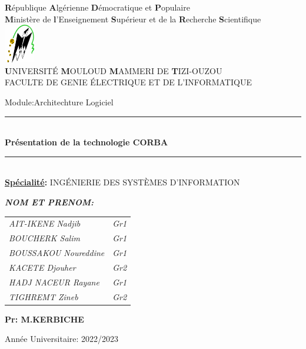 \thispagestyle{empty}

\begin{center} 

\large \textbf{R}épublique \textbf{A}lgérienne \textbf{D}émocratique et \textbf{P}opulaire\\
\textbf{M}inistère de\textbf{ l}’Enseignement \textbf{S}upérieur et de la\textbf{ R}echerche \textbf{S}cientifique\\
\includegraphics[width=0.1\textwidth]{pdg/ummto.png}\\
\textbf{U}NIVERSITÉ \textbf{M}OULOUD \textbf{M}AMMERI DE \textbf{T}IZI-OUZOU\\ \vspace*{0.3cm}
FACULTE DE GENIE ÉLECTRIQUE ET DE L’INFORMATIQUE\\\vfill


\end{center}


\begin{center}
    \huge Module:Architechture Logiciel\normalsize\\
 
    \rule{0.90\textwidth}{2pt}\\
    \LARGE \textbf
    {Présentation de la technologie \textbf{CORBA}}\\
    \normalsize
    \rule{0.90\textwidth}{2pt}\\
    \textbf{\underline{Spécialité}:} \large INGÉNIERIE DES SYSTÈMES D'INFORMATION \\
  \end{center}
    \vfill
    
    
    \begin{flushleft}   
      \large\emph{\textbf{NOM ET PRENOM:}}\\ \vspace*{0.2cm}
      \begin{tabular}{ll}
        \hline \hline
        \emph{AIT-IKENE Nadjib}    & \small\textit{Gr1} \\ 
        \emph{BOUCHERK Salim}   &  \small\textit{Gr1}\\
        \emph{BOUSSAKOU Noureddine} &\small\textit{Gr1}\\
        \emph{KACETE Djouher} &\small\textit{Gr2} \\
        \emph{HADJ NACEUR Rayane} &  \small\textit{Gr1}\\
        \emph{TIGHREMT Zineb} & \small\textit{Gr2}\\
        \hline \hline
      \end{tabular}
    \end{flushleft}
    \vfill 
    \begin{flushright}
     \large \textbf {Pr: M.KERBICHE} \\
    \end{flushright}
  \vfill

\begin{flushright}
\large Année Universitaire: 2022/2023\\
\end{flushright}
   
    
%